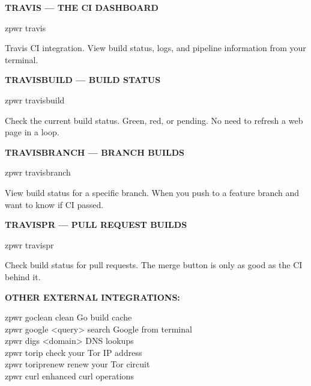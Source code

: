 \documentclass[11pt,a4paper,twoside]{book}
\begin{document}
\vspace{12pt}
{\bfseries\color{neonyellow} TRAVIS — THE CI DASHBOARD}\vspace{4pt}

\begin{codebox}
\color{neongreen}zpwr travis\\
\end{codebox}

Travis CI integration. View build status, logs, and pipeline information from your terminal.


\vspace{12pt}
{\bfseries\color{neonyellow} TRAVISBUILD — BUILD STATUS}\vspace{4pt}

\begin{codebox}
\color{neongreen}zpwr travisbuild\\
\end{codebox}

Check the current build status. Green, red, or pending. No need to refresh a web page in a loop.


\vspace{12pt}
{\bfseries\color{neonyellow} TRAVISBRANCH — BRANCH BUILDS}\vspace{4pt}

\begin{codebox}
\color{neongreen}zpwr travisbranch\\
\end{codebox}

View build status for a specific branch. When you push to a feature branch and want to know if CI passed.


\vspace{12pt}
{\bfseries\color{neonyellow} TRAVISPR — PULL REQUEST BUILDS}\vspace{4pt}

\begin{codebox}
\color{neongreen}zpwr travispr\\
\end{codebox}

Check build status for pull requests. The merge button is only as good as the CI behind it.


\vspace{12pt}
{\bfseries\color{neonyellow} OTHER EXTERNAL INTEGRATIONS:}\vspace{4pt}

\begin{codebox}
\color{neongreen}zpwr goclean          clean Go build cache\\
\color{neongreen}zpwr google <query>    search Google from terminal\\
\color{neongreen}zpwr digs <domain>     DNS lookups\\
\color{neongreen}zpwr torip            check your Tor IP address\\
\color{neongreen}zpwr toriprenew       renew your Tor circuit\\
\color{neongreen}zpwr curl             enhanced curl operations\\
\end{codebox}
\end{document}

